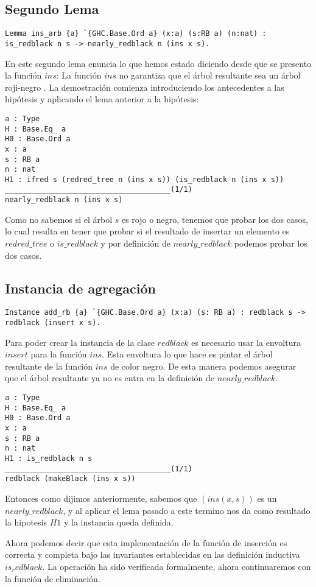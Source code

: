 \documentclass[letterpaper,12pt,oneside]{book}
\newcommand{\arn}{árbol roji-negro }
\theoremstyle{plain}
\theoremstyle{definition}
\theoremstyle{remark}
\begin{document}
\subsection{Segundo Lema}
\begin{verbatim}
Lemma ins_arb {a} `{GHC.Base.Ord a} (x:a) (s:RB a) (n:nat) : 
is_redblack n s -> nearly_redblack n (ins x s).
\end{verbatim}
En este segundo lema enuncia lo que hemos estado diciendo desde que se presento la funci\'on $ins$: La funci\'on $ins$ no garantiza que el \'arbol 
resultante sea un \arn. La demostraci\'on comienza introduciendo los antecedentes a las hipótesis y aplicando el lema anterior a la hip\'otesis:
\begin{verbatim}
a : Type
H : Base.Eq_ a
H0 : Base.Ord a
x : a
s : RB a
n : nat
H1 : ifred s (redred_tree n (ins x s)) (is_redblack n (ins x s))
______________________________________(1/1)
nearly_redblack n (ins x s)
\end{verbatim}
Como no sabemos si el \'arbol $s$ es rojo o negro, tenemos que probar los dos casos, lo cual resulta en tener que probar si el resultado de insertar un elemento
es $redred\_tree$ o $is\_redblack$ y por definici\'on  de $nearly\_redblack$ podemos probar los dos casos.
\subsection{Instancia de agregaci\'on}
\begin{verbatim}
Instance add_rb {a} `{GHC.Base.Ord a} (x:a) (s: RB a) : redblack s -> redblack (insert x s).
\end{verbatim}
Para poder crear la instancia de la clase $redblack$ es necesario usar la envoltura $insert$ para la funci\'on $ins$. Esta envoltura lo que hace es pintar el \'arbol resultante de la funci\'on $ins$ de color negro. De esta manera podemos asegurar que el \'arbol resultante ya no es entra en la definici\'on de $nearly\_redblack$.
\begin{verbatim}
a : Type
H : Base.Eq_ a
H0 : Base.Ord a
x : a
s : RB a
n : nat
H1 : is_redblack n s
______________________________________(1/1)
redblack (makeBlack (ins x s))
\end{verbatim}
Entonces como dijimos anteriormente, sabemos que $(ins(x,s))$ es un $nearly\_redblack$, y al aplicar el lema pasado a este termino nos da como resultado la hipotesis $H1$ y la instancia queda definida.

Ahora podemos decir que esta implementaci\'on de la funci\'on de inserci\'on es correcta y completa bajo las invariantes establecidas en las definici\'on inductiva $is_redblack$. La operaci\'on ha sido verificada formalmente, ahora continuaremos con la funci\'on de eliminaci\'on.  
\end{document}

